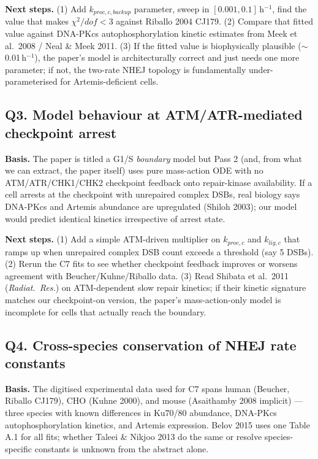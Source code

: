 \textbf{Next steps.} (1) Add $k_{proc,c,backup}$ parameter, sweep in $[0.001,0.1]$\,h$^{-1}$, find the value that makes $\chi^2/dof<3$ against Riballo 2004 CJ179. (2) Compare that fitted value against DNA-PKcs autophosphorylation kinetic estimates from Meek et al.\ 2008 / Neal \& Meek 2011. (3) If the fitted value is biophysically plausible ($\sim$0.01\,h$^{-1}$), the paper's model is architecturally correct and just needs one more parameter; if not, the two-rate NHEJ topology is fundamentally under-parameterised for Artemis-deficient cells.

\subsection*{Q3. Model behaviour at ATM/ATR-mediated checkpoint arrest}
\textbf{Basis.} The paper is titled a G1/S \emph{boundary} model but Pass 2 (and, from what we can extract, the paper itself) uses pure mass-action ODE with no ATM/ATR/CHK1/CHK2 checkpoint feedback onto repair-kinase availability. If a cell arrests at the checkpoint with unrepaired complex DSBs, real biology says DNA-PKcs and Artemis abundance are upregulated (Shiloh 2003); our model would predict identical kinetics irrespective of arrest state.

\textbf{Next steps.} (1) Add a simple ATM-driven multiplier on $k_{proc,c}$ and $k_{lig,c}$ that ramps up when unrepaired complex DSB count exceeds a threshold (say 5 DSBs). (2) Rerun the C7 fits to see whether checkpoint feedback improves or worsens agreement with Beucher/Kuhne/Riballo data. (3) Read Shibata et al.\ 2011 (\textit{Radiat.\ Res.}) on ATM-dependent slow repair kinetics; if their kinetic signature matches our checkpoint-on version, the paper's mass-action-only model is incomplete for cells that actually reach the boundary.

\subsection*{Q4. Cross-species conservation of NHEJ rate constants}
\textbf{Basis.} The digitised experimental data used for C7 spans human (Beucher, Riballo CJ179), CHO (Kuhne 2000), and mouse (Asaithamby 2008 implicit) --- three species with known differences in Ku70/80 abundance, DNA-PKcs autophosphorylation kinetics, and Artemis expression. Belov 2015 uses one Table A.1 for all fits; whether Taleei \& Nikjoo 2013 do the same or resolve species-specific constants is unknown from the abstract alone.

